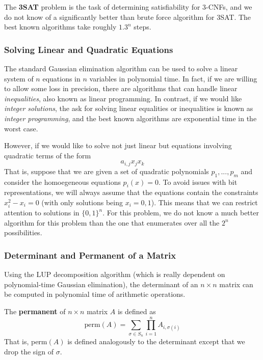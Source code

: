\documentclass{article}
\begin{document}
  The \textbf{3SAT} problem is the task of determining satisfiability for $3$-CNFs, and we do not know of a significantly better than brute force algorithm for 3SAT. The best known algorithms take roughly $1.3^n$ steps. 

  \subsubsection{Solving Linear and Quadratic Equations}
  The standard Gaussian elimination algorithm can be used to solve a linear system of $n$ equations in $n$ variables in polynomial time. In fact, if we are willing to allow some loss in precision, there are algorithms that can handle linear \textit{inequalities}, also known as linear programming. In contrast, if we would like \textit{integer solutions}, the ask for solving linear equalities or inequalities is known as \textit{integer programming}, and the best known algorithms are exponential time in the worst case. 

  However, if we would like to solve not just linear but equations involving quadratic terms of the form 
  \[a_{i, j} x_j x_k\]
  That is, suppose that we are given a set of quadratic polynomials $p_1, ..., p_m$ and consider the homoegeneous equations $p_i (x) = 0$. To avoid issues with bit representations, we will always assume that the equations contain the constraints $x_i^2 - x_i = 0$ (with only solutions being $x_i = 0, 1$). This means that we can restrict attention to solutions in $\{0,1\}^n$. For this problem, we do not know a much better algorithm for this problem than the one that enumerates over all the $2^n$ possibilities. 

  \subsubsection{Determinant and Permanent of a Matrix}
  Using the LUP decomposition algorithm (which is really dependent on polynomial-time Gaussian elimination), the determinant of an $n \times n$ matrix can be computed in polynomial time of arithmetic operations. 

  \begin{definition}
  The \textbf{permanent} of $n \times n$ matrix $A$ is defined as
  \[\text{perm}(A)= \sum_{\sigma \in S_n} \prod_{i=1}^n A_{i, \sigma(i)}\]
  That is, perm$(A)$ is defined analogously to the determinant except that we drop the sign of $\sigma$. 
  \end{definition}
\end{document}

